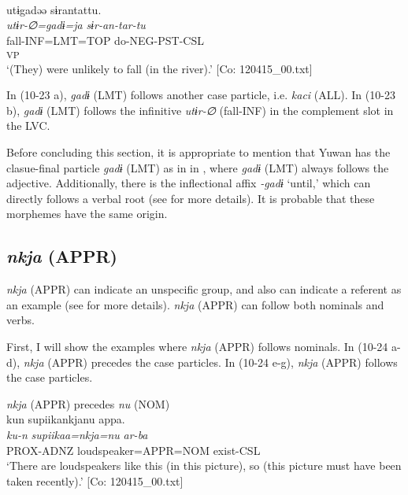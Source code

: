   \ex{}\\
      \gllll    utɨgadəə  sɨrantattu.\\
      \textit{utɨr-∅=gadɨ=ja}  \textit{sɨr-an-tar-tu}\\
      fall-INF=LMT=TOP  do-NEG-PST-CSL\\
      [Complement  LV]\textsubscript{VP}\\
      \glt ‘(They) were unlikely to fall (in the river).’    [Co: 120415\_00.txt]
    \z
\z

In (10-23 a), \textit{gadɨ} (LMT) follows another case particle, i.e. \textit{kaci} (ALL). In (10-23 b), \textit{gadɨ} (LMT) follows the infinitive \textit{utɨr-∅} (fall-INF) in the complement slot in the LVC.

  Before concluding this section, it is appropriate to mention that Yuwan has the clasue-final particle \textit{gadɨ} (LMT) as in  in , where \textit{gadɨ} (LMT) always follows the adjective. Additionally, there is the inflectional affix \textit{{}-gadɨ} ‘until,’ which can directly follows a verbal root (see  for more details). It is probable that these morphemes have the same origin.

\subsection{\textit{nkja} (APPR)}\label{sec:10.1.6}

\textit{nkja} (APPR) can indicate an unspecific group, and also can indicate a referent as an example (see  for more details). \textit{nkja} (APPR) can follow both nominals and verbs.

  First, I will show the examples where \textit{nkja} (APPR) follows nominals. In (10-24 a-d), \textit{nkja} (APPR) precedes the case particles. In (10-24 e-g), \textit{nkja} (APPR) follows the case particles.

\ea\label{ex:10.24} 
  \ea \textit{nkja} (APPR) precedes \textit{nu} (NOM)\\
      \glll    kun  {\textbar}supiika{\textbar}nkjanu  appa.\\
      \textit{ku-n}  \textit{supiikaa=nkja=nu}  \textit{ar-ba}\\
      PROX-ADNZ  loudspeaker=APPR=NOM  exist-CSL\\
      \glt       ‘There are loudspeakers like this (in this picture), so (this picture must have been taken recently).’ [Co: 120415\_00.txt]

